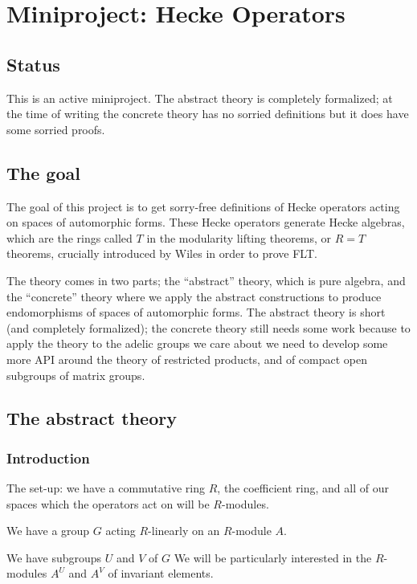 \chapter{Miniproject: Hecke Operators}\label{HeckeOperator_project}

\section{Status}

This is an active miniproject. The abstract theory is completely formalized;
at the time of writing the concrete theory has no sorried definitions
but it does have some sorried proofs.

\section{The goal}

The goal of this project is to get sorry-free definitions of Hecke operators
acting on spaces of automorphic forms. These Hecke operators generate
Hecke algebras, which are the rings called $T$ in the modularity lifting theorems,
or $R=T$ theorems, crucially introduced by Wiles in order to prove FLT.

The theory comes in two parts;
the ``abstract'' theory, which is pure algebra, and the ``concrete'' theory
where we apply the abstract constructions to produce endomorphisms of
spaces of automorphic forms. The abstract theory is short (and completely formalized);
the concrete theory still needs some work because to apply the theory to the
adelic groups we care about we need to develop some more API around the theory
of restricted products, and of compact open subgroups of matrix groups.

\section{The abstract theory}

\subsection{Introduction}

The set-up: we have a commutative ring $R$, the coefficient ring, and
all of our spaces which the operators act on will be $R$-modules.

We have a group $G$ acting $R$-linearly on an $R$-module $A$.

We have subgroups $U$ and $V$ of $G$
We will be particularly interested in the $R$-modules $A^U$ and $A^V$
of invariant elements.

